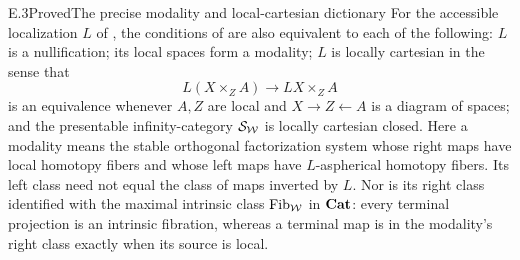 \begin{claim}{E.3}{Proved}{The precise modality and local-cartesian dictionary}
For the accessible localization $L$ of , the conditions
of  are also equivalent to each of the following:
$L$ is a nullification; its local spaces form a modality; $L$ is
locally cartesian in the sense that
\[
 L(X\times_ZA)\longrightarrow LX\times_ZA                 \tag{E.3.1}
\]
is an equivalence whenever $A,Z$ are local and $X\to Z\leftarrow A$
is a diagram of spaces; and the presentable infinity-category
$\mathcal{S}_{\mathcal{W}}$ is locally cartesian closed.
Here a modality means the stable orthogonal factorization system
whose right maps have local homotopy fibers and whose left maps
have $L$-aspherical homotopy fibers. Its left class need not equal
the class of maps inverted by $L$.
Nor is its right class identified with the maximal intrinsic
class $\operatorname{Fib}_{\mathcal{W}}$ in $\mathbf{Cat}$: every terminal projection is
an intrinsic fibration, whereas a terminal map is in the
modality's right class exactly when its source is local.
\end{claim}
